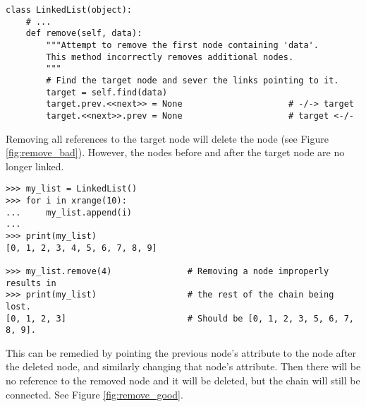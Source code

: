 \begin{lstlisting}
class LinkedList(object):
    # ...
    def remove(self, data):
        """Attempt to remove the first node containing 'data'.
        This method incorrectly removes additional nodes.
        """
        # Find the target node and sever the links pointing to it.
        target = self.find(data)
        target.prev.<<next>> = None                     # -/-> target
        target.<<next>>.prev = None                     # target <-/-
\end{lstlisting}

Removing all references to the target node will delete the node (see Figure \ref{fig:remove_bad}).
However, the nodes before and after the target node are no longer linked.

\begin{lstlisting}
>>> my_list = LinkedList()
>>> for i in xrange(10):
...     my_list.append(i)
...
>>> print(my_list)
[0, 1, 2, 3, 4, 5, 6, 7, 8, 9]

>>> my_list.remove(4)               # Removing a node improperly results in
>>> print(my_list)                  # the rest of the chain being lost.
[0, 1, 2, 3]                        # Should be [0, 1, 2, 3, 5, 6, 7, 8, 9].
\end{lstlisting}

This can be remedied by pointing the previous node's  attribute to the node after the deleted node, and similarly changing that node's  attribute.
Then there will be no reference to the removed node and it will be deleted, but the chain will still be connected.
See Figure \ref{fig:remove_good}.

